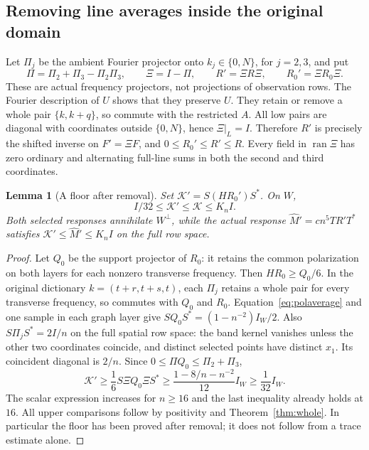 \documentclass[11pt]{article}
\DeclareMathOperator{\ran}{ran}
\newtheorem{lemma}[theorem]{Lemma}
\theoremstyle{definition}
\theoremstyle{remark}
\begin{document}
\subsection{Removing line averages inside the original domain}
Let $\Pi_j$ be the ambient Fourier projector onto $k_j\in\{0,N\}$,
for $j=2,3$, and put
\[
 \Pi=\Pi_2+\Pi_3-\Pi_2\Pi_3,\qquad \Xi=I-\Pi,
 \qquad R'=\Xi R\Xi,\qquad R_0'=\Xi R_0\Xi.
\]
These are actual frequency projectors, not projections of observation rows.
The Fourier description of $U$ shows that they preserve $U$. They retain
or remove a whole pair $\{k,k+q\}$, so commute with the restricted $A$.
All low pairs are diagonal with coordinates outside $\{0,N\}$, hence
$\Xi|_L=I$. Therefore $R'$ is precisely the shifted inverse on
$F'=\Xi F$, and $0\le R_0'\le R'\le R$.
Every field in $\ran\Xi$ has zero ordinary and alternating full-line
sums in both the second and third coordinates.

\begin{lemma}[A floor after removal]\label{lem:floorremoved}
Set $\mathcal K'=S(HR_0')S^*$. On $W$,
\begin{equation}\label{eq:removedfloor}
              I/32\le\mathcal K'\le\mathcal K\le K_n I.
\end{equation}
Both selected responses annihilate $W^\perp$, while the actual response
$\widehat M'=cn^5TR'T^*$ satisfies
$\mathcal K'\le\widehat M'\le K_nI$ on the full row space.
\end{lemma}
\begin{proof}
Let $Q_0$ be the support projector of $R_0$: it retains the common
polarization on both layers for each nonzero transverse frequency.
Then $HR_0\ge Q_0/6$. In the original dictionary
$k=(t+r,t+s,t)$, each $\Pi_j$ retains a whole pair for every transverse
frequency, so commutes with $Q_0$ and $R_0$.
Equation~\eqref{eq:polaverage} and one sample in each graph layer give
$SQ_0S^*=(1-n^{-2})I_W/2$. Also $S\Pi_jS^*=2I/n$ on the full
spatial row space: the band kernel vanishes unless the other two
coordinates coincide, and distinct selected points have distinct $x_1$.
Its coincident diagonal is $2/n$. Since $0\le\Pi Q_0\le\Pi_2+\Pi_3$,
\[
 \mathcal K'\ge \frac16S\Xi Q_0\Xi S^*
 \ge\frac{1-8/n-n^{-2}}{12}I_W\ge\frac1{32}I_W.
\]
The scalar expression increases for $n\ge16$ and the last inequality
already holds at $16$. All upper comparisons follow by positivity and
Theorem~\ref{thm:whole}. In particular the floor has been proved after
removal; it does not follow from a trace estimate alone.
\end{proof}
\end{document}
